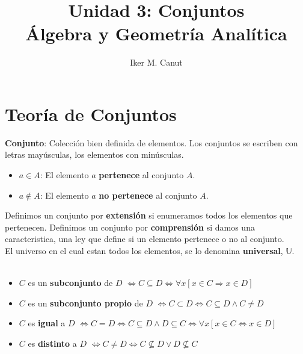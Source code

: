 \documentclass[11pt,a4paper]{article}
\author{Iker M. Canut}
\title{Unidad 3: Conjuntos\\\'Algebra y Geometr\'ia Anal\'itica}
\begin{document}
\maketitle
\newpage
\section{Teor\'ia de Conjuntos}
\textbf{Conjunto}: Colecci\'on bien definida de elementos. Los conjuntos se escriben con letras may\'usculas, los elementos con min\'usculas.
\begin{itemize}
\item $a \in A$: El elemento $a$ \textbf{pertenece} al conjunto $A$.
\item $a \not \in A$: El elemento $a$ \textbf{no pertenece} al conjunto $A$.
\end{itemize}
Definimos un conjunto por \textbf{extensi\'on} si enumeramos todos los elementos que pertenecen. Definimos un conjunto por \textbf{comprensi\'on} si damos una caracteristica, una ley que define si un elemento pertenece o no al conjunto.\\

El universo en el cual estan todos los elementos, se lo denomina \textbf{universal}, $\mathbb{U}$.\\

\noindent \dotfill\\

\begin{itemize}
\item $C$ es un \textbf{subconjunto} de $D$ $\iff C \subseteq D \iff \forall x[x \in C \Rightarrow x \in D]$

\item $C$ es un \textbf{subconjunto propio} de $D$ $\iff C \subset D \iff C \subseteq D \land C \not = D$

\item $C$ es \textbf{igual} a $D$ $\iff C = D \iff C \subseteq D \land D \subseteq C \iff \forall x[x \in C \iff x \in D]$
\item $C$ es \textbf{distinto} a $D$ $\iff C \not = D \iff C \not \subseteq D \lor D \not \subseteq C$
\end{itemize}
\noindent \dotfill\\
\end{document}

